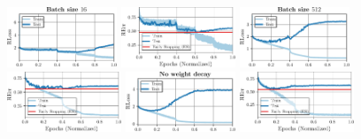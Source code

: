 \begin{figure}[t]
\begin{minipage}[t]{0.19\textwidth}
		\includegraphics[height=1.8cm]{plots_supp_training_curves_b16_loss}
		
		\hspace*{-0.25cm}
		\includegraphics[height=1.8cm]{plots_supp_training_curves_b16_error}
	\end{minipage}
	\begin{minipage}[t]{0.19\textwidth}
		\vspace*{0px}
		
		\includegraphics[height=1.8cm]{plots_supp_training_curves_b512_loss}
		
		\hspace*{-0.25cm}
		\includegraphics[height=1.8cm]{plots_supp_training_curves_b512_error}
	\end{minipage}
	\begin{minipage}[t]{0.19\textwidth}
		\vspace*{0px}
		
		\includegraphics[height=1.8cm]{plots_supp_training_curves_nowd_loss}
		
		\hspace*{-0.25cm}
		\includegraphics[height=1.8cm]{plots_supp_training_curves_nowd_error}
	\end{minipage}
	\\[2.5px]
	\begin{minipage}[t]{0.19\textwidth}
		\vspace*{0px}
		

\end{minipage}
\end{figure}
